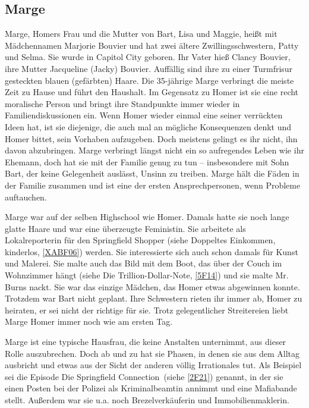 \subsection{Marge}\label{MargeSimpson}
Marge, Homers Frau und die Mutter von Bart, Lisa und Maggie, heißt mit Mädchennamen Marjorie Bouvier und hat zwei ältere Zwillingsschwestern, Patty und Selma. Sie wurde in Capitol City geboren. Ihr Vater hieß Clancy Bouvier, ihre Mutter Jacqueline (Jacky) Bouvier. Auffällig sind ihre zu einer Turmfrisur gesteckten blauen (gefärbten) Haare. Die 35-jährige Marge verbringt die meiste Zeit zu Hause und führt den Haushalt. Im Gegensatz zu Homer ist sie eine recht moralische Person und bringt ihre Standpunkte immer wieder in Familiendiskussionen ein. Wenn Homer wieder einmal eine seiner verrückten Ideen hat, ist sie diejenige, die auch mal an mögliche Konsequenzen denkt und Homer bittet, sein Vorhaben aufzugeben. Doch meistens gelingt es ihr nicht, ihn davon abzubringen. Marge verbringt längst nicht ein so aufregendes Leben wie ihr Ehemann, doch hat sie mit der Familie genug zu tun -- insbesondere mit Sohn Bart, der keine Gelegenheit auslässt, Unsinn zu treiben. Marge hält die Fäden in der Familie zusammen und ist eine der ersten Ansprechpersonen, wenn Probleme auftauchen.

Marge war auf der selben Highschool wie Homer. Damals hatte sie noch lange glatte Haare und war eine überzeugte Feministin. Sie arbeitete als Lokalreporterin für den Springfield Shopper (siehe \glqq Doppeltes Einkommen, kinderlos\grqq, \ref{XABF06}) werden. Sie interessierte sich auch schon damals für Kunst und Malerei. Sie malte auch das Bild mit dem Boot, das über der Couch im Wohnzimmer hängt (siehe \glqq Die Trillion-Dollar-Note\grqq , \ref{5F14}) und sie malte Mr. Burns nackt. Sie war das einzige Mädchen, das Homer etwas abgewinnen konnte. Trotzdem war Bart nicht geplant. Ihre Schwestern rieten ihr immer ab, Homer zu heiraten, er sei nicht der richtige für sie. Trotz gelegentlicher Streitereien liebt Marge Homer immer noch wie am ersten Tag.

Marge ist eine typische Hausfrau, die keine Anstalten unternimmt, aus dieser Rolle auszubrechen. Doch ab und zu hat sie Phasen, in denen sie aus dem Alltag ausbricht und etwas aus der Sicht der anderen völlig Irrationales tut. Als Beispiel sei die Episode \glqq Die Springfield Connection\grqq\ (siehe \ref{2F21}) genannt, in der sie einen Posten bei der Polizei als Kriminalbeamtin annimmt und eine Mafiabande stellt. Außerdem war sie u.a. noch Brezelverkäuferin und Immobilienmaklerin.

